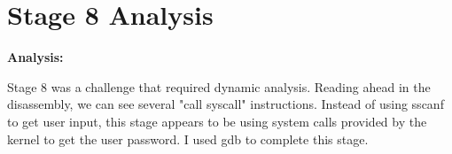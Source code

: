 \documentclass{article}
\begin{document}
\newpage
\section{Stage 8 Analysis}
\begin{flushleft}
\vspace{.5pc}
\end{flushleft}

\begin{flushleft}
\textbf{Analysis:}
\vspace{.5pc}
\end{flushleft}
\par
Stage 8 was a challenge that required dynamic analysis.  Reading ahead in the
disassembly, we can see several "call syscall" instructions.  Instead of using
sscanf to get user input, this stage appears to be using system calls provided
by the kernel to get the user password.  I used gdb to complete this stage.
\end{document}
